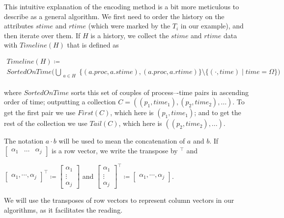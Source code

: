\documentclass[12pt]{article}
\begin{document}
This intuitive explanation of the encoding method is a bit more meticulous to describe as a general algorithm. We first need to order the history on the attributes $stime$ and $rtime$ (which were marked by the $T_i$ in our example), and then iterate over them. If $H$ is a history, we collect the $stime$ and $rtime$ data with $Timeline(H)$ that is defined as

%

\begin{gather*}
Timeline(H) \coloneq \\
SortedOnTime\Big(
  \bigcup\limits_{\substack{a \in H}} 
  \big\{(a.proc, a.stime),  
  (a.proc,a.rtime)\big\}\setminus \{(\cdot,time)\mid time=\Omega\}
\Big)
\end{gather*}


where $SortedOnTime$ sorts this set of couples of process–-time pairs in ascending order of time; outputting a collection $C=((p_1,time_1),(p_2,time_2),...)$. To get the first pair we use $First(C)$, which here is $(p_1,time_1)$; and to get the rest of the collection we use $Tail(C)$, which here is $((p_2,time_2),...)$.

The notation $a\cdot b$ will be used to mean the concatenation of $a$ and $b$. If $\begin{bmatrix}
\alpha_1 & \hdots & \alpha_j\end{bmatrix}$ is a row vector, we write the transpose by $^\top$ and 
\begin{center}
$\begin{bmatrix}
\alpha_1 , \cdots , \alpha_j
\end{bmatrix}^\top\coloneq
\begin{bmatrix}
\alpha_1 \\ \vdots \\ \alpha_j
\end{bmatrix}$ and 
$\begin{bmatrix}
\alpha_1 \\ \vdots \\ \alpha_j
\end{bmatrix}^\top\coloneq
\begin{bmatrix}
\alpha_1 , \cdots , \alpha_j
\end{bmatrix}$.
\end{center}
 We will use the transposes of row vectors to represent column vectors in our algorithms, as it facilitates the reading.
\end{document}
